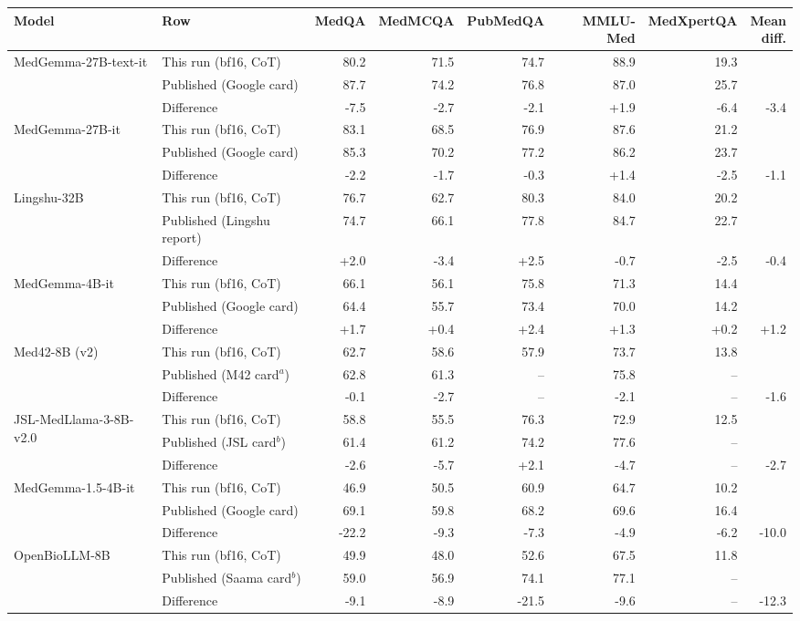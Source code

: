 \begin{tabular}{@{}llrrrrrr@{}}
\toprule
Model & Row & MedQA & MedMCQA & PubMedQA & MMLU-Med & MedXpertQA & \thead{Mean\\diff.} \\
\midrule
\multirow{3}{*}{MedGemma-27B-text-it} & This run (bf16, CoT) & 80.2 & 71.5 & 74.7 & 88.9 & 19.3 & \\
 & Published (Google card) & 87.7 & 74.2 & 76.8 & 87.0 & 25.7 & \\
 & Difference & -7.5 & -2.7 & -2.1 & +1.9 & -6.4 & -3.4 \\
\midrule
\multirow{3}{*}{MedGemma-27B-it} & This run (bf16, CoT) & 83.1 & 68.5 & 76.9 & 87.6 & 21.2 & \\
 & Published (Google card) & 85.3 & 70.2 & 77.2 & 86.2 & 23.7 & \\
 & Difference & -2.2 & -1.7 & -0.3 & +1.4 & -2.5 & -1.1 \\
\midrule
\multirow{3}{*}{Lingshu-32B} & This run (bf16, CoT) & 76.7 & 62.7 & 80.3 & 84.0 & 20.2 & \\
 & Published (Lingshu report) & 74.7 & 66.1 & 77.8 & 84.7 & 22.7 & \\
 & Difference & +2.0 & -3.4 & +2.5 & -0.7 & -2.5 & -0.4 \\
\midrule
\multirow{3}{*}{MedGemma-4B-it} & This run (bf16, CoT) & 66.1 & 56.1 & 75.8 & 71.3 & 14.4 & \\
 & Published (Google card) & 64.4 & 55.7 & 73.4 & 70.0 & 14.2 & \\
 & Difference & +1.7 & +0.4 & +2.4 & +1.3 & +0.2 & +1.2 \\
\midrule
\multirow{3}{*}{Med42-8B (v2)} & This run (bf16, CoT) & 62.7 & 58.6 & 57.9 & 73.7 & 13.8 & \\
 & Published (M42 card$^{a}$) & 62.8 & 61.3 & -- & 75.8 & -- & \\
 & Difference & -0.1 & -2.7 & -- & -2.1 & -- & -1.6 \\
\midrule
\multirow{3}{*}{JSL-MedLlama-3-8B-v2.0} & This run (bf16, CoT) & 58.8 & 55.5 & 76.3 & 72.9 & 12.5 & \\
 & Published (JSL card$^{b}$) & 61.4 & 61.2 & 74.2 & 77.6 & -- & \\
 & Difference & -2.6 & -5.7 & +2.1 & -4.7 & -- & -2.7 \\
\midrule
\multirow{3}{*}{MedGemma-1.5-4B-it} & This run (bf16, CoT) & 46.9 & 50.5 & 60.9 & 64.7 & 10.2 & \\
 & Published (Google card) & 69.1 & 59.8 & 68.2 & 69.6 & 16.4 & \\
 & Difference & -22.2 & -9.3 & -7.3 & -4.9 & -6.2 & -10.0 \\
\midrule
\multirow{3}{*}{OpenBioLLM-8B} & This run (bf16, CoT) & 49.9 & 48.0 & 52.6 & 67.5 & 11.8 & \\
 & Published (Saama card$^{b}$) & 59.0 & 56.9 & 74.1 & 77.1 & -- & \\
 & Difference & -9.1 & -8.9 & -21.5 & -9.6 & -- & -12.3 \\
\bottomrule
\end{tabular}
